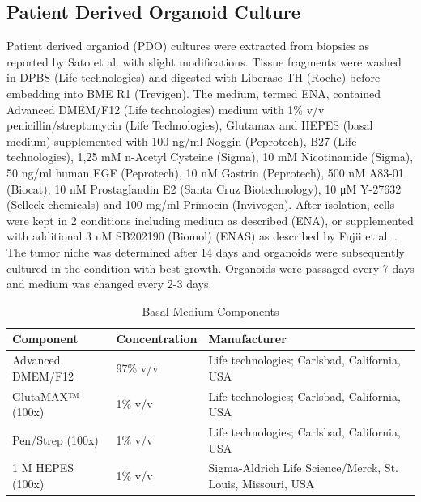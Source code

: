 \begin{flushleft}
\subsection{Patient Derived Organoid Culture}
Patient derived organiod (PDO) cultures were extracted from biopsies as reported by Sato et al. \citep{satoLongtermExpansionEpithelial2011} with slight modifications. Tissue fragments were washed in DPBS (Life technologies) and digested with Liberase TH (Roche) before embedding into BME R1 (Trevigen). The medium, termed ENA, contained Advanced DMEM/F12 (Life technologies) medium with 1\% v/v penicillin/streptomycin (Life Technologies), Glutamax and HEPES (basal medium) supplemented with 100 ng/ml Noggin (Peprotech), B27 (Life technologies), 1,25 mM n-Acetyl Cysteine (Sigma), 10 mM Nicotinamide (Sigma), 50 ng/ml human EGF (Peprotech), 10 nM Gastrin (Peprotech), 500 nM A83-01 (Biocat), 10 nM Prostaglandin E2 (Santa Cruz Biotechnology), 10 μM Y-27632 (Selleck chemicals) and 100 mg/ml Primocin (Invivogen). After isolation, cells were kept in 2 conditions including medium as described (ENA), or supplemented with additional 3 uM SB202190 (Biomol) (ENAS) as described by Fujii et al. \citep{Fujii2016-ax}. 
The tumor niche was determined after 14 days and organoids were subsequently cultured in the condition with best growth. 
Organoids were passaged every 7 days and medium was changed every 2-3 days.

\begin{table}[htbp]
\caption{Basal Medium Components}
\label{tab:basal_medium_components}
\begin{tabularx}{\textwidth}{Xll}
\toprule
\textbf{Component} &  \textbf{Concentration} & \textbf{Manufacturer} \\
\midrule
Advanced DMEM/F12 & 97\% v/v & Life technologies; Carlsbad, California, USA \\
GlutaMAX™ (100x) & 1\% v/v & Life technologies; Carlsbad, California, USA \\
Pen/Strep (100x) & 1\% v/v & Life technologies; Carlsbad, California, USA \\
1 M HEPES (100x) & 1\% v/v & Sigma-Aldrich Life Science/Merck, St. Louis, Missouri, USA \\
\bottomrule
\end{tabularx}
\end{table}


\end{flushleft}
